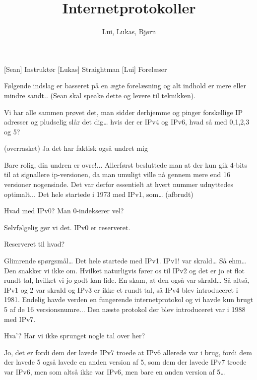 \documentclass[a4paper,11pt]{article}
\title{Internetprotokoller}
\author{Lui, Lukas, Bjørn}
\begin{document}
\maketitle

\begin{roles}
[Sean] Instruktør
[Lukas] Straightman
[Lui] Forelæser
\end{roles}

\begin{props}
\end{props}


\begin{sketch}
 Følgende indslag er basseret på en ægte forelæsning og alt indhold er mere eller mindre sandt.. (Sean skal speake dette og levere til teknikken).


 Vi har alle sammen prøvet det, man sidder derhjemme og pinger forskellige IP adresser og pludselig slår det dig… hvis der er IPv4 og IPv6, hvad så med 0,1,2,3 og 5? 

 (overrasket) Ja det har faktisk også undret mig

Bare rolig, din undren er ovre!...
Allerførst besluttede man at der kun gik 4-bits til at signallere ip-versionen, da man umuligt ville nå gennem mere end 16 versioner nogensinde. Det var derfor essentielt at hvert nummer udnyttedes optimalt...
Det hele startede i 1973 med IPv1, som… (afbrudt)

 Hvad med IPv0? Man 0-indekserer vel?

 Selvfølgelig gør vi det. IPv0 er reserveret.

 Reserveret til hvad? 

 Glimrende spørgsmål… Det hele startede med IPv1. IPv1! var skrald… Så ehm… Den snakker vi ikke om. Hvilket naturligvis fører os til IPv2 og det er jo et flot rundt tal, hvilket vi jo godt kan lide. En skam, at den også var skrald… Så altså, IPv1 og 2 var skrald og IPv3 er ikke et rundt tal, så IPv4 blev introduceret i 1981. Endelig havde verden en fungerende internetprotokol og vi havde kun brugt 5 af de 16 versionsnumre...
Den næste protokol der blev introduceret var i 1988 med IPv7.

 Hva’? Har vi ikke sprunget nogle tal over her? 

 Jo, det er fordi dem der lavede IPv7 troede at IPv6 allerede var i brug, fordi dem der lavede 5 også lavede en anden version af 5, som dem der lavede IPv7 troede var IPv6, men som altså ikke var IPv6, men bare en anden version af 5…


\end{sketch}
\end{document}
